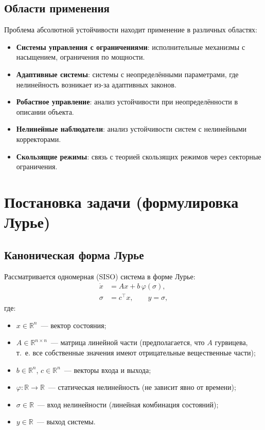 \section{Области применения}

Проблема абсолютной устойчивости находит применение в различных областях:
\begin{itemize}
    \item \textbf{Системы управления с ограничениями}: исполнительные механизмы с насыщением, ограничения по мощности.
    \item \textbf{Адаптивные системы}: системы с неопределёнными параметрами, где нелинейность возникает из-за адаптивных законов.
    \item \textbf{Робастное управление}: анализ устойчивости при неопределённости в описании объекта.
    \item \textbf{Нелинейные наблюдатели}: анализ устойчивости систем с нелинейными корректорами.
    \item \textbf{Скользящие режимы}: связь с теорией скользящих режимов через секторные ограничения.
\end{itemize}

\chapter{Постановка задачи (формулировка Лурье)}

\section{Каноническая форма Лурье}

Рассматривается одномерная (SISO) система в форме Лурье:
\begin{equation}
    \begin{aligned}
        \dot x &= Ax + b\,\varphi(\sigma),\\
        \sigma &= c^\top x, \qquad y = \sigma,
    \end{aligned}
    \label{eq:lurie}
\end{equation}
где:
\begin{itemize}
    \item $x\in\mathbb{R}^n$~--- вектор состояния;
    \item $A\in\mathbb{R}^{n\times n}$~--- матрица линейной части (предполагается, что $A$ гурвицева, т.~е. все собственные значения имеют отрицательные вещественные части);
    \item $b\in\mathbb{R}^n$, $c\in\mathbb{R}^n$~--- векторы входа и выхода;
    \item $\varphi:\mathbb{R}\to\mathbb{R}$~--- статическая нелинейность (не зависит явно от времени);
    \item $\sigma\in\mathbb{R}$~--- вход нелинейности (линейная комбинация состояний);
    \item $y\in\mathbb{R}$~--- выход системы.
\end{itemize}

